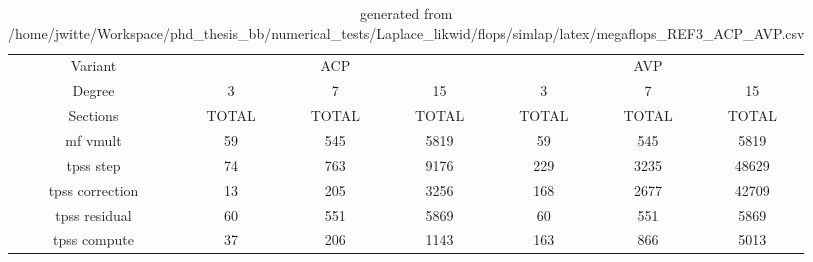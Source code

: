 \documentclass[oneside,a4paper]{article}
\newcommand{\myrowcolor}{\rowcolor[gray]{0.925}}
\begin{document}
\begin{table}[htbp]
\centering

\caption{generated from /home/jwitte/Workspace/phd\_thesis\_bb/numerical\_tests/Laplace\_likwid/flops/simlap/latex/megaflops\_REF3\_ACP\_AVP.csv}
\begin{tabular}{ccccccc}
\toprule %
Variant & \multicolumn{3}{c}{ACP} & \multicolumn{3}{c}{AVP} \\
\cmidrule(lr){1-1} \cmidrule(lr){2-4} \cmidrule(lr){5-7}
Degree & 3 & 7 & 15 & 3 & 7 & 15 \\
\cmidrule(lr){1-7}
Sections & TOTAL & TOTAL & TOTAL & TOTAL & TOTAL & TOTAL \\
\midrule %
\myrowcolor
mf vmult & 59 & 545 & 5819 & 59 & 545 & 5819 \\
tpss step & 74 & 763 & 9176 & 229 & 3235 & 48629 \\
\myrowcolor
tpss correction & 13 & 205 & 3256 & 168 & 2677 & 42709 \\
tpss residual & 60 & 551 & 5869 & 60 & 551 & 5869 \\
\myrowcolor
tpss compute & 37 & 206 & 1143 & 163 & 866 & 5013 \\
\bottomrule
\end{tabular}

\end{table}
\end{document}
